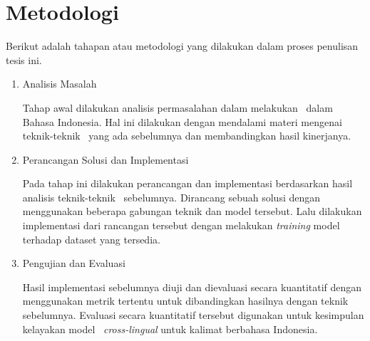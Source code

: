 \section{Metodologi}

Berikut adalah tahapan atau metodologi yang dilakukan dalam proses penulisan tesis ini.

\begin{enumerate}
  \item Analisis Masalah
  
  Tahap awal dilakukan analisis permasalahan dalam melakukan \amrparsing~dalam Bahasa Indonesia.
  Hal ini dilakukan dengan mendalami materi mengenai teknik-teknik \amrparsing~yang ada sebelumnya dan membandingkan hasil kinerjanya.

  \item Perancangan Solusi dan Implementasi
  
  Pada tahap ini dilakukan perancangan dan implementasi berdasarkan hasil analisis teknik-teknik \amrparsing~sebelumnya.
  Dirancang sebuah solusi dengan menggunakan beberapa gabungan teknik dan model tersebut.
  Lalu dilakukan implementasi dari rancangan tersebut dengan melakukan \textit{training} model terhadap dataset yang tersedia.

  \item Pengujian dan Evaluasi
  
  Hasil implementasi sebelumnya diuji dan dievaluasi secara kuantitatif dengan menggunakan metrik tertentu untuk dibandingkan hasilnya dengan teknik sebelumnya.
  Evaluasi secara kuantitatif
  tersebut digunakan untuk kesimpulan kelayakan model \amrparsing~\textit{cross-lingual} untuk kalimat berbahasa Indonesia.
  
\end{enumerate}
